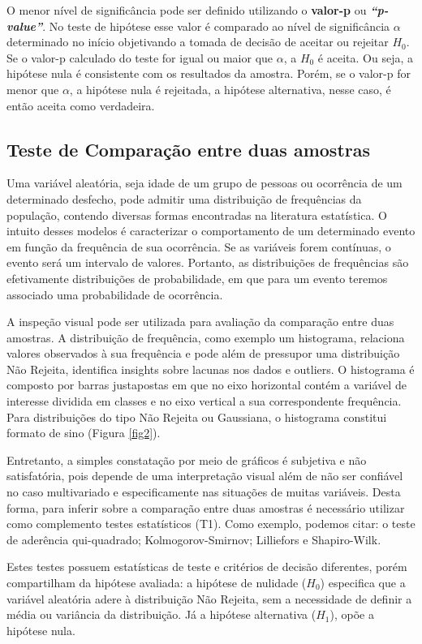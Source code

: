 \documentclass[12pt,fleqn]{article}
\begin{document}
{O menor nível de significância pode ser definido utilizando o \textbf{valor-p} ou \textit{\textbf{“p-value”}}. No teste de hipótese esse valor é comparado ao nível de significância $\alpha$ determinado no início objetivando a tomada de decisão de aceitar ou rejeitar $H_0$. Se o valor-p calculado do teste for igual ou maior que $\alpha$, a $H_0$ é aceita. Ou seja, a hipótese nula é consistente com os resultados da amostra. Porém, se o valor-p for menor que $\alpha$, a hipótese nula é rejeitada, a hipótese alternativa, nesse caso, é então aceita como verdadeira. 

\subsection{Teste de Comparação entre duas amostras}
Uma variável aleatória, seja idade de um grupo de pessoas ou ocorrência de um determinado desfecho, pode admitir uma distribuição de frequências da população, contendo diversas formas encontradas na literatura estatística. O intuito desses modelos é caracterizar o comportamento de um determinado evento em função da frequência de sua ocorrência. Se as variáveis forem contínuas, o evento será um intervalo de valores. Portanto, as distribuições de frequências são efetivamente distribuições de probabilidade, em que para um evento teremos associado uma probabilidade de ocorrência.

A inspeção visual pode ser utilizada para avaliação da comparação entre duas amostras. A distribuição de frequência, como exemplo um histograma, relaciona valores observados à sua frequência e pode além de pressupor uma distribuição Não Rejeita, identifica insights sobre lacunas nos dados e outliers. O histograma é composto por barras justapostas em que no eixo horizontal contém a variável de interesse dividida em classes e no eixo vertical a sua correspondente frequência. Para distribuições do tipo Não Rejeita ou Gaussiana, o histograma constitui formato de sino (Figura \ref{fig2}).

Entretanto, a simples constatação por meio de gráficos é subjetiva e não satisfatória, pois depende de uma interpretação visual além de não ser confiável no caso multivariado e especificamente nas situações de muitas variáveis. Desta forma, para inferir sobre a comparação entre duas amostras é necessário utilizar como complemento testes estatísticos (T1).  Como exemplo, podemos citar: o teste de aderência qui-quadrado; Kolmogorov-Smirnov; Lilliefors e Shapiro-Wilk. 

Estes testes possuem estatísticas de teste e critérios de decisão diferentes, porém compartilham da hipótese avaliada: a hipótese de nulidade ($H_0$) especifica que a variável aleatória adere à distribuição Não Rejeita, sem a necessidade de definir a média ou variância da distribuição. Já a hipótese alternativa ($H_1$), opõe a hipótese nula.

}
\end{document}
